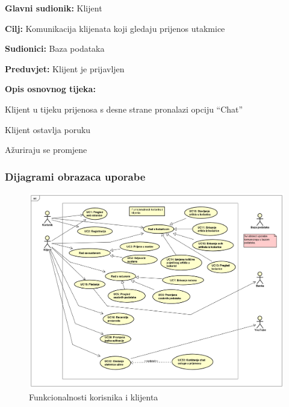 				\noindent {}
				\begin{packed_item}
					
					\item \textbf{Glavni sudionik: } Klijent
					\item  \textbf{Cilj:} Komunikacija klijenata koji gledaju prijenos utakmice
					\item  \textbf{Sudionici:} Baza podataka
					\item  \textbf{Preduvjet:} Klijent je prijavljen
					\item  \textbf{Opis osnovnog tijeka:}
					
					\item[] \begin{packed_enum}
						\item Klijent u tijeku prijenosa s desne strane pronalazi opciju “Chat”
						\item Klijent ostavlja poruku
						\item Ažuriraju se promjene
					\end{packed_enum}
				\end{packed_item}
				
				
					
				\subsubsection{Dijagrami obrazaca uporabe}
					
				
					
					\begin{figure}[H]
						\includegraphics[width=\linewidth]{dijagrami/Funkcionalnosti_korisnika_i_klijenta.png}
						\centering
						\caption{Funkcionalnosti korisnika i klijenta}
						\label{fig:UseCaseDiagram1}
					\end{figure}
				
